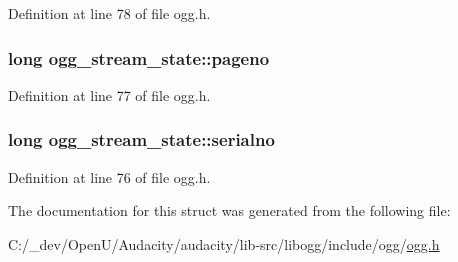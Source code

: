 Definition at line 78 of file ogg.\+h.

\subsubsection[{\texorpdfstring{pageno}{pageno}}]{\setlength{\rightskip}{0pt plus 5cm}long ogg\+\_\+stream\+\_\+state\+::pageno}\hypertarget{structogg__stream__state_a0ad3315203fcebdc2ccd3b050d28a65c}{}\label{structogg__stream__state_a0ad3315203fcebdc2ccd3b050d28a65c}


Definition at line 77 of file ogg.\+h.

\subsubsection[{\texorpdfstring{serialno}{serialno}}]{\setlength{\rightskip}{0pt plus 5cm}long ogg\+\_\+stream\+\_\+state\+::serialno}\hypertarget{structogg__stream__state_a79248e3f1f41cde5331909e8edd98e10}{}\label{structogg__stream__state_a79248e3f1f41cde5331909e8edd98e10}


Definition at line 76 of file ogg.\+h.



The documentation for this struct was generated from the following file\+:\begin{DoxyCompactItemize}
\item 
C\+:/\+\_\+dev/\+Open\+U/\+Audacity/audacity/lib-\/src/libogg/include/ogg/\hyperlink{ogg_8h}{ogg.\+h}\end{DoxyCompactItemize}
